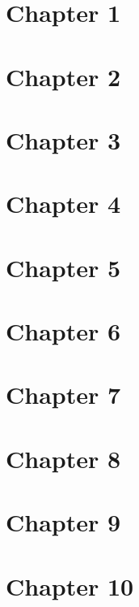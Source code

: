 \documentclass{article}
\theoremstyle{definition}
\begin{document}

\section{Chapter 1}





\section{Chapter 2}





\section{Chapter 3}

\newpage

\newpage

\newpage
\section{Chapter 4}




\section{Chapter 5}



\section{Chapter 6}







\section{Chapter 7}




\section{Chapter 8}


\section{Chapter 9}



\section{Chapter 10}



\end{document}
